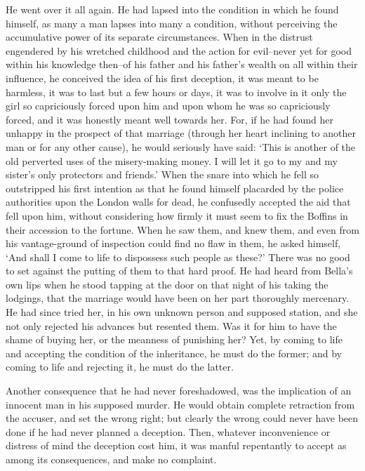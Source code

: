 He went over it all again. He had lapsed into the condition in which
he found himself, as many a man lapses into many a condition, without
perceiving the accumulative power of its separate circumstances. When
in the distrust engendered by his wretched childhood and the action for
evil--never yet for good within his knowledge then--of his father and
his father’s wealth on all within their influence, he conceived the idea
of his first deception, it was meant to be harmless, it was to last
but a few hours or days, it was to involve in it only the girl so
capriciously forced upon him and upon whom he was so capriciously
forced, and it was honestly meant well towards her. For, if he had
found her unhappy in the prospect of that marriage (through her heart
inclining to another man or for any other cause), he would seriously
have said: ‘This is another of the old perverted uses of the
misery-making money. I will let it go to my and my sister’s only
protectors and friends.’ When the snare into which he fell so
outstripped his first intention as that he found himself placarded by
the police authorities upon the London walls for dead, he confusedly
accepted the aid that fell upon him, without considering how firmly it
must seem to fix the Boffins in their accession to the fortune. When he
saw them, and knew them, and even from his vantage-ground of inspection
could find no flaw in them, he asked himself, ‘And shall I come to life
to dispossess such people as these?’ There was no good to set against
the putting of them to that hard proof. He had heard from Bella’s own
lips when he stood tapping at the door on that night of his taking
the lodgings, that the marriage would have been on her part thoroughly
mercenary. He had since tried her, in his own unknown person and
supposed station, and she not only rejected his advances but resented
them. Was it for him to have the shame of buying her, or the meanness of
punishing her? Yet, by coming to life and accepting the condition of the
inheritance, he must do the former; and by coming to life and rejecting
it, he must do the latter.

Another consequence that he had never foreshadowed, was the implication
of an innocent man in his supposed murder. He would obtain complete
retraction from the accuser, and set the wrong right; but clearly the
wrong could never have been done if he had never planned a deception.
Then, whatever inconvenience or distress of mind the deception cost him,
it was manful repentantly to accept as among its consequences, and make
no complaint.

